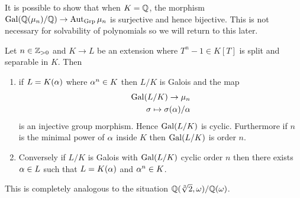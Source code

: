 \documentclass{article}
\begin{document}
\begin{rmk}
  It is possible to show that when $K = \mathbb{Q}$,
  the morphism $\operatorname{Gal}(\mathbb{Q}(\mu_n) / \mathbb{Q}) \to \operatorname{Aut}_{\mathrm{Grp}} \mu_n$ is surjective
  and hence bijective.
  This is not necessary for solvability of polynomials
  so we will return to this later.
\end{rmk}

\begin{prop}
  
  Let $n \in \mathbb{Z}_{> 0}$ and 
  $K \to L$ be an extension where $T^n - 1 \in K[T]$ is split 
  and separable in $K$.
  Then \begin{enumerate}
    \item if $L = K(\alpha)$ where $\alpha^n \in K$ then $L / K$ is Galois 
    and the map \begin{align*}
      \operatorname{Gal}(L / K) \to \mu_n \\
      \sigma \mapsto \sigma(\alpha) / \alpha
    \end{align*}
    is an injective group morphism.
    Hence $\operatorname{Gal}(L / K)$ is cyclic.
    Furthermore if $n$ is the minimal power of $\alpha$ inside $K$
    then $\operatorname{Gal}(L / K)$ is order $n$.
    \item Conversely if $L / K$ is Galois with $\operatorname{Gal}(L / K)$ cyclic order $n$
    then there exists $\alpha \in L$ such that $L = K(\alpha)$ and $\alpha^n \in K$.
  \end{enumerate}
\end{prop}
This is completely analogous to the situation 
$\mathbb{Q}(\sqrt[3]{2} , \omega) / \mathbb{Q}(\omega)$.
\end{document}
